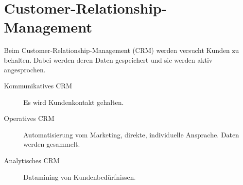 \documentclass{article}
\begin{document}
\section{Customer-Relationship-Management} 
Beim Customer-Relationship-Management (CRM) werden versucht Kunden zu behalten. Dabei werden deren Daten gespeichert und sie werden aktiv angesprochen.
\begin{description}
 \item[Kommunikatives CRM] Es wird Kundenkontakt gehalten.
 \item[Operatives CRM] Automatisierung vom Marketing, direkte, individuelle Ansprache. Daten werden gesammelt.
 \item[Analytisches CRM] Datamining von Kundenbedürfnissen.
\end{description}
\end{document}
